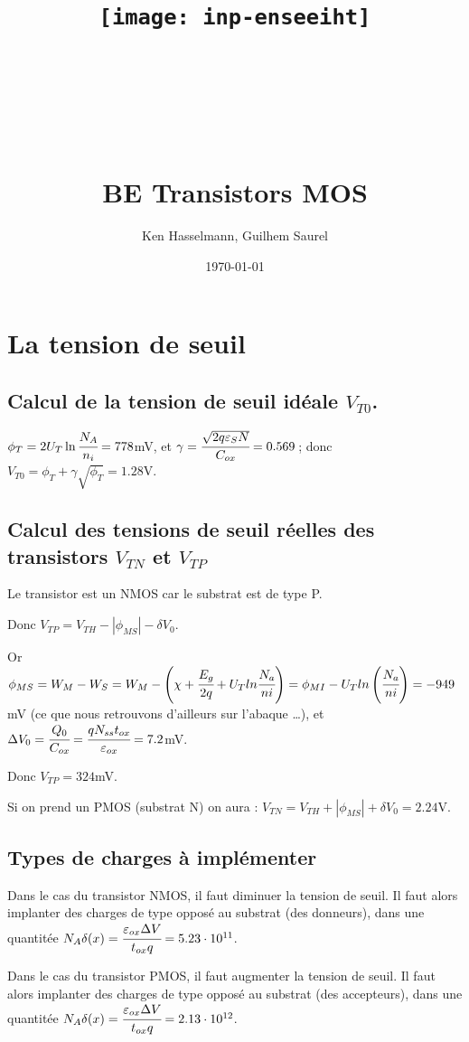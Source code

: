 \documentclass[10pt]{article}
\title{\texttt{[image: inp-enseeiht]} \\ ~ \\ ~ \\ ~ \\ ~ \\ BE Transistors MOS}
\author{Ken Hasselmann, Guilhem Saurel}
\date{\today}
\begin{document}
 \begin{titlepage}
  \maketitle
  \tableofcontents
 \end{titlepage}

 \section{La tension de seuil}
  \subsection{Calcul de la tension de seuil idéale $V_{T0}$.}
   $\phi_T = 2 U_T \ln\cfrac{N_A}{n_i} = 778$mV,
   et $\gamma = \cfrac{\sqrt{2q\varepsilon_SN}}{C_{ox}} = 0.569$\,;
   donc $V_{T0} = \phi_T + \gamma\sqrt{\phi_T} = 1.28$V.

  \subsection{Calcul des tensions de seuil réelles des transistors $V_{TN}$ et $V_{TP}$}
   Le transistor est un NMOS car le substrat est de type P.
   
   Donc  $V_{TP} = V_{TH} - |\phi_{MS}| - \delta{V_0}$. %

   
   Or $\phi_{MS} = W_M - W_S = W_M - \left(\chi + \cfrac{E_g}{2q} + U_T ln \cfrac{N_a}{ni} \right) = \phi_{MI} - U_T ln \left(\cfrac{N_a}{ni}\right) = -949$mV (ce que nous retrouvons d’ailleurs sur l’abaque …),
   et $\Delta V_0 = \cfrac{Q_0}{C_{ox}} = \cfrac{q N_{ss} t_{ox}}{\varepsilon_{ox}} = 7.2$mV.
   
   Donc $V_{TP} = 324$mV.
      
   Si on prend un PMOS (substrat N) on aura :
   $V_{TN} = V_{TH} + |\phi_{MS}| + \delta{V_0} = 2.24$V.

  \subsection{Types de charges à implémenter}
  Dans le cas du transistor NMOS, il faut diminuer la tension de seuil. 
  Il faut alors implanter des charges de type opposé au substrat (des donneurs),
  dans une quantitée 
  $N_A \delta(x) = \cfrac{\varepsilon_{ox} \Delta V}{t_{ox} q} = 5.23\cdot 10^{11}$.

  Dans le cas du transistor PMOS, il faut augmenter la tension de seuil. 
  Il faut alors implanter des charges de type opposé au substrat (des accepteurs),
  dans une quantitée  
  $N_A \delta(x) = \cfrac{\varepsilon_{ox} \Delta V}{t_{ox} q} = 2.13\cdot 10^{12}$.
  
\end{document}
